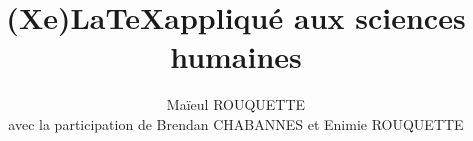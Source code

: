 \documentclass[twoside,10pt]{book}
\begin{document}
\title{(Xe)\LaTeX appliqué aux sciences humaines}
\author{Maïeul ROUQUETTE \\ avec la participation de Brendan CHABANNES et Enimie ROUQUETTE}
\date{}


\end{document}
